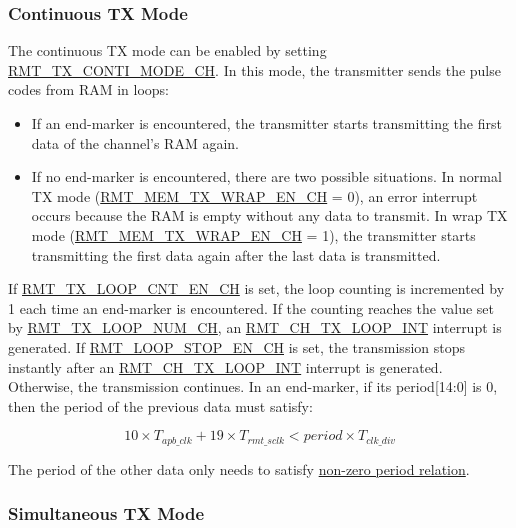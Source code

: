 \documentclass[main\_\_EN.tex]{subfiles}
\begin{document}
\subsubsection{Continuous TX Mode}

The continuous TX mode can be enabled by setting \hyperref[fielddesc:RMTTXCONTIMODECHN]{RMT\_TX\_CONTI\_MODE\_CH}. In this mode, the transmitter sends the pulse codes from RAM in loops:
\begin{itemize}
    \item If an end-marker is encountered, the transmitter starts transmitting the first data of the channel's RAM again. 
    \item If no end-marker is encountered, there are two possible situations. In normal TX mode (\hyperref[fielddesc:RMTMEMTXWRAPENCHN]{RMT\_MEM\_TX\_WRAP\_EN\_CH} = 0), an error interrupt occurs because the RAM is empty without any data to transmit. In wrap TX mode (\hyperref[fielddesc:RMTMEMTXWRAPENCHN]{RMT\_MEM\_TX\_WRAP\_EN\_CH} = 1), the transmitter starts transmitting the first data again after the last data is transmitted.
\end{itemize}

If \hyperref[fielddesc:RMTTXLOOPCNTENCHN]{RMT\_TX\_LOOP\_CNT\_EN\_CH} is set, the loop counting is incremented by 1 each time an end-marker is encountered. If the counting reaches the value set by \hyperref[fielddesc:RMTTXLOOPNUMCHN]{RMT\_TX\_LOOP\_NUM\_CH}, an \hyperref[int:RMTCHnTXLOOPINT]{RMT\_CH\_TX\_LOOP\_INT} interrupt is generated. If \hyperref[fielddesc:RMTLOOPSTOPENCHN]{RMT\_LOOP\_STOP\_EN\_CH} is set, the transmission stops instantly after an \hyperref[int:RMTCHnTXLOOPINT]{RMT\_CH\_TX\_LOOP\_INT} interrupt is generated. Otherwise, the transmission continues. In an end-marker, if its period[14:0] is 0, then the period of the previous data must satisfy:

\begin{equation}
10 \times T_{apb\_clk} + 19 \times T_{rmt\_sclk} < period \times T_{clk\_div}
\end{equation}

The period of the other data only needs to satisfy \hyperref[eq:rmt-period-value]{non-zero period relation}.


\subsubsection{Simultaneous TX Mode}
\end{document}
